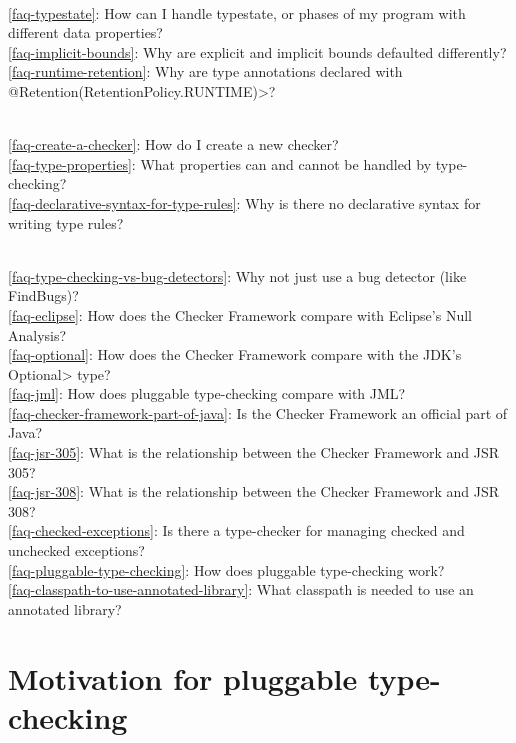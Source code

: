 \\ \ref{faq-typestate}: How can I handle typestate, or phases of my program with different data properties?
\\ \ref{faq-implicit-bounds}: Why are explicit and implicit bounds defaulted differently?
\\ \ref{faq-runtime-retention}: Why are type annotations declared with \<@Retention(RetentionPolicy.RUNTIME)>?

\\ \ref{faq-create-a-checker}: How do I create a new checker?
\\ \ref{faq-type-properties}: What properties can and cannot be handled by type-checking?
\\ \ref{faq-declarative-syntax-for-type-rules}: Why is there no declarative syntax for writing type rules?

\\ \ref{faq-type-checking-vs-bug-detectors}: Why not just use a bug detector (like FindBugs)?
\\ \ref{faq-eclipse}: How does the Checker Framework compare with Eclipse's Null Analysis?
\\ \ref{faq-optional}: How does the Checker Framework compare with the JDK's \<Optional> type?
\\ \ref{faq-jml}: How does pluggable type-checking compare with JML?
\\ \ref{faq-checker-framework-part-of-java}: Is the Checker Framework an official part of Java?
\\ \ref{faq-jsr-305}: What is the relationship between the Checker Framework and JSR 305?
\\ \ref{faq-jsr-308}: What is the relationship between the Checker Framework and JSR 308?
\\ \ref{faq-checked-exceptions}: Is there a type-checker for managing checked and unchecked exceptions?
\\ \ref{faq-pluggable-type-checking}: How does pluggable type-checking work?
\\ \ref{faq-classpath-to-use-annotated-library}: What classpath is needed to use an annotated library?


\section{Motivation for pluggable type-checking\label{faq-motivation-section}}

